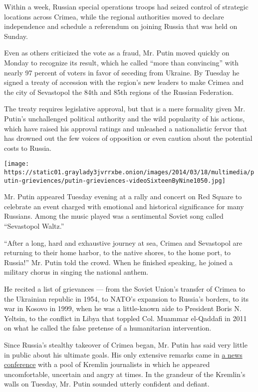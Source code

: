 Within a week, Russian special operations troops had seized control of
strategic locations across Crimea, while the regional authorities moved
to declare independence and schedule a referendum on joining Russia that
was held on Sunday.

Even as others criticized the vote as a fraud, Mr. Putin moved quickly
on Monday to recognize its result, which he called ``more than
convincing'' with nearly 97 percent of voters in favor of seceding from
Ukraine. By Tuesday he signed a treaty of accession with the region's
new leaders to make Crimea and the city of Sevastopol the 84th and 85th
regions of the Russian Federation.

The treaty requires legislative approval, but that is a mere formality
given Mr. Putin's unchallenged political authority and the wild
popularity of his actions, which have raised his approval ratings and
unleashed a nationalistic fervor that has drowned out the few voices of
opposition or even caution about the potential costs to Russia.

\texttt{[image: https://static01.graylady3jvrrxbe.onion/images/2014/03/18/multimedia/putin-grieviences/putin-grieviences-videoSixteenByNine1050.jpg]}

Mr. Putin appeared Tuesday evening at a rally and concert on Red Square
to celebrate an event charged with emotional and historical significance
for many Russians. Among the music played was a sentimental Soviet song
called ``Sevastopol Waltz.''

``After a long, hard and exhaustive journey at sea, Crimea and
Sevastopol are returning to their home harbor, to the native shores, to
the home port, to Russia!'' Mr. Putin told the crowd. When he finished
speaking, he joined a military chorus in singing the national anthem.

He recited a list of grievances --- from the Soviet Union's transfer of
Crimea to the Ukrainian republic in 1954, to NATO's expansion to
Russia's borders, to its war in Kosovo in 1999, when he was a
little-known aide to President Boris N. Yeltsin, to the conflict in
Libya that toppled Col. Muammar el-Qaddafi in 2011 on what he called the
false pretense of a humanitarian intervention.

Since Russia's stealthy takeover of Crimea began, Mr. Putin has said
very little in public about his ultimate goals. His only extensive
remarks came in
\href{http://www.nytimes3xbfgragh.onion/2014/03/05/world/europe/putin-flashing-disdain-defends-action-in-crimea.html}{a
news conference} with a pool of Kremlin journalists in which he appeared
uncomfortable, uncertain and angry at times. In the grandeur of the
Kremlin's walls on Tuesday, Mr. Putin sounded utterly confident and
defiant.

